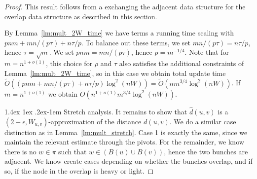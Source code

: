 \documentclass[11pt]{article}
\makeatletter
\theoremstyle{definition}
\theoremstyle{remark}
\renewcommand{\paragraph}{%
  \@startsection{paragraph}{4}%
  {\z@}{1.4ex \@plus 1ex \@minus .2ex}{-1em}%
  {\normalfont\normalsize\bfseries}%
}
\makeatother
\begin{document}
\thmtwoW*
\begin{proof}
    This result follows from a exchanging the adjacent data structure for the overlap data structure as described in this section. 
    
    By Lemma~\ref{lm:mult_2W_time} we have terms a running time scaling with $pnm+mn/(p\tau)+n\tau/p$. To balance out these terms, we set $mn/(p\tau)=n\tau/p$, hence $\tau=\sqrt{m}$. We set $pnm = mn/(p\tau)$, hence $p=m^{-1/4}$. Note that for $m=n^{1+o(1)}$, this choice for $\rho$ and $\tau$ also satisfies the additional constraints of Lemma~\ref{lm:mult_2W_time}, so in this case we obtain total update time $\tilde O( (pnm+mn/(p\tau)+n\tau/p)\log^2(nW))= \tilde O (nm^{3/4}\log^2(nW))$. If $m=n^{1+o(1)}$ we obtain $\tilde O (n^{1+o(1)}m^{3/4}\log^2(nW))$.
    
    \paragraph{Stretch analysis.} It remains to show that $\hat d(u,v)$ is a $(2+\epsilon,W_{u,v})$-approximation of the distance $d(u,v)$. We do a similar case distinction as in Lemma~\ref{lm:mult_stretch}. Case 1 is exactly the same, since we maintain the relevant estimate through the pivots. For the remainder, we know there is no $w\in \pi$ such that $w\in (B(u)\cup B(v))$, hence the two bunches are adjacent. We know create cases depending on whether the bunches overlap, and if so, if the node in the overlap is heavy or light. 
    

\end{proof}
\end{document}
